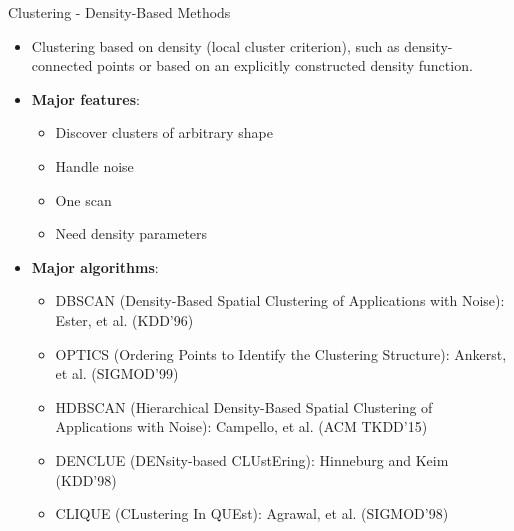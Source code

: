 \begin{frame}[allowframebreaks]{Clustering - Density-Based Methods}
\begin{itemize}
    \setlength{\itemsep}{0.1em}
    \item Clustering based on density (local cluster criterion), such as density-connected points or based on an explicitly constructed density function.
    \item \textbf{Major features}:
    \begin{itemize}
        \item Discover clusters of arbitrary shape
        \item Handle noise
        \item One scan
        \item Need density parameters
    \end{itemize}

    \framebreak
    
    \item \textbf{Major algorithms}:
    \begin{itemize}
        \item DBSCAN (Density-Based Spatial Clustering of Applications with Noise): Ester, et al. (KDD’96)
        \item OPTICS (Ordering Points to Identify the Clustering Structure): Ankerst, et al. (SIGMOD’99)
        \item HDBSCAN (Hierarchical Density-Based Spatial Clustering of Applications with Noise): Campello, et al. (ACM TKDD’15)
        \item DENCLUE (DENsity-based CLUstEring): Hinneburg and Keim (KDD’98)
        \item CLIQUE (CLustering In QUEst): Agrawal, et al. (SIGMOD’98)
    \end{itemize}
\end{itemize}
\end{frame}

